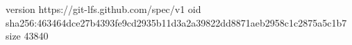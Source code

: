 version https://git-lfs.github.com/spec/v1
oid sha256:463464dce27b4393fe9cd2935b11d3a2a39822dd8871aeb2958c1c2875a5c1b7
size 43840

